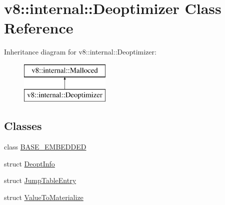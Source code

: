 \hypertarget{classv8_1_1internal_1_1_deoptimizer}{}\section{v8\+:\+:internal\+:\+:Deoptimizer Class Reference}
\label{classv8_1_1internal_1_1_deoptimizer}
Inheritance diagram for v8\+:\+:internal\+:\+:Deoptimizer\+:\begin{figure}[H]
\begin{center}
\leavevmode
\includegraphics[height=2.000000cm]{classv8_1_1internal_1_1_deoptimizer}
\end{center}
\end{figure}
\subsection*{Classes}
\begin{DoxyCompactItemize}
\item 
class \hyperlink{classv8_1_1internal_1_1_deoptimizer_1_1_b_a_s_e___e_m_b_e_d_d_e_d}{B\+A\+S\+E\+\_\+\+E\+M\+B\+E\+D\+D\+ED}
\item 
struct \hyperlink{structv8_1_1internal_1_1_deoptimizer_1_1_deopt_info}{Deopt\+Info}
\item 
struct \hyperlink{structv8_1_1internal_1_1_deoptimizer_1_1_jump_table_entry}{Jump\+Table\+Entry}
\item 
struct \hyperlink{structv8_1_1internal_1_1_deoptimizer_1_1_value_to_materialize}{Value\+To\+Materialize}
\end{DoxyCompactItemize}
